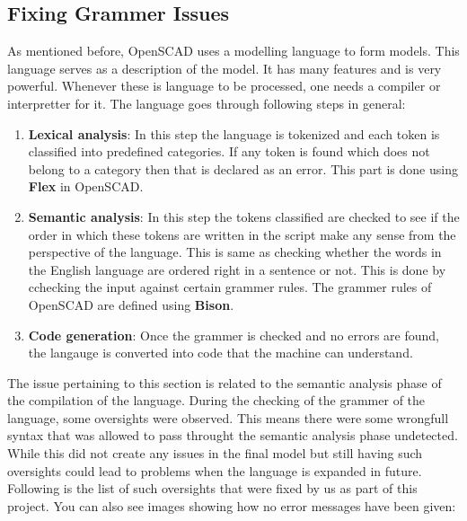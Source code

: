 \subsection{Fixing Grammer Issues}
As mentioned before, OpenSCAD uses a modelling language to form models. This language serves as a description of the model. It has many features and is very powerful. Whenever these is language to be processed, one needs a compiler or interpretter for it. The language goes through following steps in general:
\begin{enumerate}
	\item \textbf{Lexical analysis}: In this step the language is tokenized and each token is classified into predefined categories. If any token is found which does not belong to a category then that is declared as an error. This part is done using \textbf{Flex} in OpenSCAD.
	\item \textbf{Semantic analysis}: In this step the tokens classified are checked to see if the order in which these tokens are written in the script make any sense from the perspective of the language. This is same as checking whether the words in the English language are ordered right in a sentence or not. This is done by cchecking the input against certain grammer rules. The grammer rules of OpenSCAD are defined using \textbf{Bison}.
	\item \textbf{Code generation}: Once the grammer is checked and no errors are found, the langauge is converted into code that the machine can understand.
\end{enumerate}
The issue pertaining to this section is related to the semantic analysis phase of the compilation of the language. During the checking of the grammer of the language, some oversights were observed. This means there were some wrongfull syntax that was allowed to pass throught the semantic analysis phase undetected. While this did not create any issues in the final model but still having such oversights could lead to problems when the language is expanded in future. Following is the list of such oversights that were fixed by us as part of this project. You can also see images showing how no error messages have been given:
